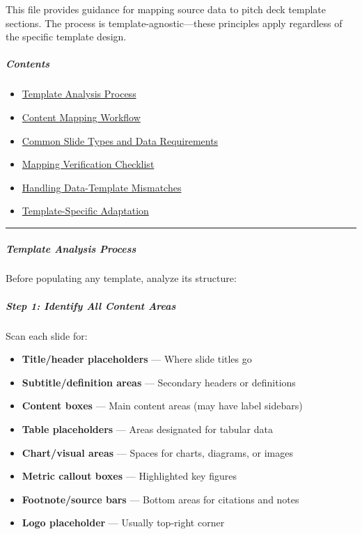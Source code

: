 \documentclass[11pt]{article}
\begin{document}
This file provides guidance for mapping source data to pitch deck template sections. The process is template-agnostic—these principles apply regardless of the specific template design.


\subparagraph{Contents}\mbox{}\par

\begin{itemize}[leftmargin=*,itemsep=2pt,topsep=2pt]
\item {} \href{\#template-analysis-process}{Template Analysis Process}
\item {} \href{\#content-mapping-workflow}{Content Mapping Workflow}
\item {} \href{\#common-slide-types-and-data-requirements}{Common Slide Types and Data Requirements}
\item {} \href{\#mapping-verification-checklist}{Mapping Verification Checklist}
\item {} \href{\#handling-data-template-mismatches}{Handling Data-Template Mismatches}
\item {} \href{\#template-specific-adaptation}{Template-Specific Adaptation}
\end{itemize}

\vspace{0.5em}\hrule\vspace{0.5em}

\subparagraph{Template Analysis Process}\mbox{}\par

Before populating any template, analyze its structure:


\subparagraph{Step 1: Identify All Content Areas}\mbox{}\par

Scan each slide for:

\begin{itemize}[leftmargin=*,itemsep=2pt,topsep=2pt]
\item {} \textbf{Title/header placeholders} — Where slide titles go
\item {} \textbf{Subtitle/definition areas} — Secondary headers or definitions
\item {} \textbf{Content boxes} — Main content areas (may have label sidebars)
\item {} \textbf{Table placeholders} — Areas designated for tabular data
\item {} \textbf{Chart/visual areas} — Spaces for charts, diagrams, or images
\item {} \textbf{Metric callout boxes} — Highlighted key figures
\item {} \textbf{Footnote/source bars} — Bottom areas for citations and notes
\item {} \textbf{Logo placeholder} — Usually top-right corner
\end{itemize}
\end{document}
